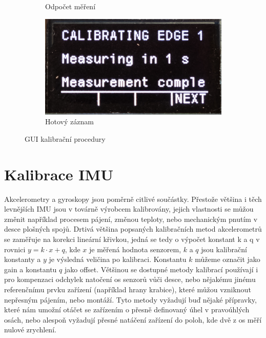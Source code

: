 \begin{figure}[h]
\begin{subfigure}[b]{0.24\textwidth}
         \caption{Odpočet měření}     
     \end{subfigure}
     \hfill
     \centering
     \begin{subfigure}[b]{0.24\textwidth}
         \centering
         \includegraphics[width=\textwidth]{obrazky/menuCAL4}
         \caption{Hotový záznam}   
     \end{subfigure}

        \caption{GUI kalibrační procedury}
        \label{fig:calibrationGUI}
\end{figure}

\section{Kalibrace IMU} \label{calibrationALG}
Akcelerometry a gyroskopy jsou poměrně citlivé součástky. Přestože většina i těch levnějších IMU jsou v továrně výrobcem kalibrovány, jejich vlastnosti se můžou změnit například procesem pájení, změnou teploty, nebo mechanickým pnutím v desce plošných spojů. Drtivá většina popsaných kalibračních metod akcelerometrů se zaměřuje na korekci lineární křivkou, jedná se tedy o výpočet konstant k a q v rovnici $ y=k\cdot x + q $, kde $ x $ je měřená hodnota senzorem, $ k $ a $ q $ jsou kalibrační konstanty a $ y $ je výsledná veličina po kalibraci. Konstantu $ k $ můžeme označit jako gain a konstantu $ q $ jako offset. Většinou se dostupné metody kalibrací používají i pro kompenzaci odchylek natočení os senzorů vůči desce, nebo nějakému jinému referenčnímu prvku zařízení (například hrany krabice), které můžou vzniknout nepřesným pájením, nebo montáží. Tyto metody vyžadují buď nějaké přípravky, které nám umožní otáčet se zařízením o přesně definovaný úhel v pravoúhlých osách, nebo alespoň vyžadují přesné natáčení zařízení do poloh, kde dvě z os měří nulové zrychlení. \cite{eUM5mr8dMf0LyseX} \cite{6yeG6wAI1hTfmXJK}

